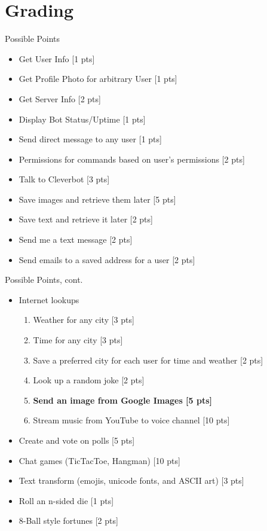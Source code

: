 \documentclass{beamer}
\begin{document}
\section{Grading}

\begin{frame}{Possible Points}
	\begin{multicols}{2}
		\begin{itemize}
			\item Get User Info [1 pts]
			\item Get Profile Photo for arbitrary User [1 pts]
			\item Get Server Info [2 pts]
			\item Display Bot Status/Uptime [1 pts]
			\item Send direct message to any user [1 pts]
			\item Permissions for commands based on user's permissions [2 pts]
			\item Talk to Cleverbot [3 pts]
			\item Save images and retrieve them later [5 pts]
			\item Save text and retrieve it later [2 pts]
			\item Send me a text message [2 pts]
			\item Send emails to a saved address for a user [2 pts]
		\end{itemize}
	\end{multicols}
	
\end{frame}


\begin{frame}{Possible Points, cont.}
	\begin{multicols}{2}
		\begin{itemize}
			\item Internet lookups
			\begin{enumerate}[--]
				\item Weather for any city [3 pts]
				\item Time for any city  [3 pts]
				\item Save a preferred city for each user for time and weather [2 pts]
				\item Look up a random joke [2 pts]
				\item \textbf{Send an image from Google Images [5 pts]}
				\item Stream music from YouTube to voice channel [10 pts]
			\end{enumerate}
			\item Create and vote on polls [5 pts]
			\item Chat games (TicTacToe, Hangman) [10 pts]
			\item Text transform (emojis, unicode fonts, and ASCII art) [3 pts]
			\item Roll an n-sided die [1 pts]
			\item 8-Ball style fortunes [2 pts]
		\end{itemize}
	\end{multicols}

\end{frame}
\end{document}
